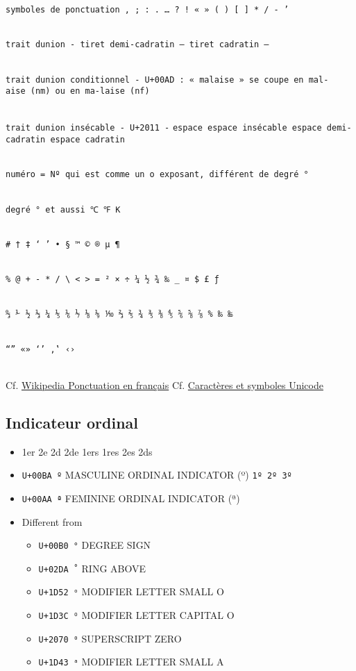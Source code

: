 \documentclass[
  a4paper,
]{book}
\providecommand{\tightlist}{%
  \setlength{\itemsep}{0pt}\setlength{\parskip}{0pt}}
\begin{document}
\texttt{symboles\ de\ ponctuation\ ,\ ;\ :\ .\ …\ ?\ !\ «\ »\ (\ )\ {[}\ {]}\ *\ /\ -\ ’}\strut \\
\texttt{trait\ d\textquotesingle{}union\ -\ tiret\ demi-cadratin\ –\ tiret\ cadratin\ —}\strut \\
\texttt{trait\ d\textquotesingle{}union\ conditionnel\ -\ U+00AD\ :\ «\ malaise\ »\ se\ coupe\ en\ mal-aise\ (nm)\ ou\ en\ ma-laise\ (nf)}\strut \\
\texttt{trait\ d\textquotesingle{}union\ insécable\ -\ U+2011\ ‑} \texttt{espace\ espace\ insécable\ espace\ demi-cadratin\ espace\ cadratin}\strut \\
\texttt{numéro\ =\ Nº\ qui\ est\ comme\ un\ o\ exposant,\ différent\ de\ degré\ °}\strut \\
\texttt{degré\ °\ et\ aussi\ ℃\ ℉\ K}\strut \\
\texttt{\#\ †\ ‡\ ‘\ ’\ •\ §\ ™\ ©\ ®\ µ\ ¶}\strut \\
\texttt{\%\ @\ +\ -\ *\ /\ \textbackslash{}\ \textless{}\ \textgreater{}\ =\ ²\ ×\ ÷\ ¼\ ½\ ¾\ ‰\ \_\ ¤\ \$\ £\ ƒ}\strut \\
\texttt{↉\ ⅟\ ½\ ⅓\ ¼\ ⅕\ ⅙\ ⅐\ ⅛\ ⅑\ ⅒\ ⅔\ ⅖\ ¾\ ⅗\ ⅜\ ⅘\ ⅚\ ⅝\ ⅞\ \%\ ‰\ ‱}\strut \\
\texttt{“”\ «»\ ‘’\ ‚‛\ ‹›}\strut \\
Cf. \href{https://fr.wikipedia.org/wiki/Ponctuation\#En_fran\%C3\%A7ais}{Wikipedia Ponctuation en français} Cf. \href{http://david.carella.free.fr/fr/typographie/caracteres-et-symboles-unicode.html}{Caractères et symboles Unicode}

\hypertarget{indicateur-ordinal}{%
\subsection{Indicateur ordinal}\label{indicateur-ordinal}}

\begin{itemize}
\tightlist
\item
  1er 2e 2d 2de 1ers 1res 2es 2ds
\item
  \texttt{U+00BA\ º} MASCULINE ORDINAL INDICATOR (º) \texttt{1º\ 2º\ 3º}
\item
  \texttt{U+00AA\ ª} FEMININE ORDINAL INDICATOR (ª)
\item
  Different from

  \begin{itemize}
  \tightlist
  \item
    \texttt{U+00B0\ °} DEGREE SIGN
  \item
    \texttt{U+02DA\ ˚} RING ABOVE
  \item
    \texttt{U+1D52\ ᵒ} MODIFIER LETTER SMALL O
  \item
    \texttt{U+1D3C\ ᴼ} MODIFIER LETTER CAPITAL O
  \item
    \texttt{U+2070\ ⁰} SUPERSCRIPT ZERO
  \item
    \texttt{U+1D43\ ᵃ} MODIFIER LETTER SMALL A
  \end{itemize}
\end{itemize}
\end{document}

